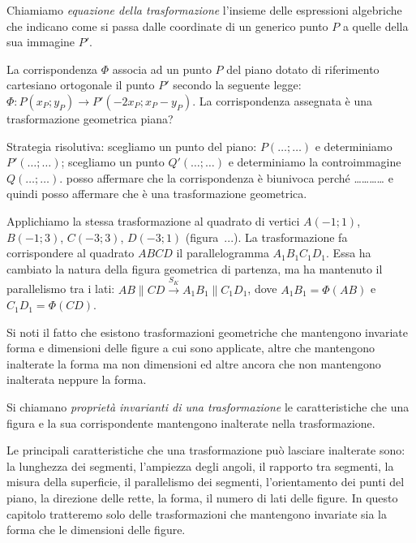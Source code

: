 \begin{definizione}
Chiamiamo \emph{equazione della trasformazione} l'insieme delle espressioni algebriche che indicano come si passa dalle coordinate di un generico punto $P$ a quelle della sua immagine $P'$.
\end{definizione}

\begin{exrig}
\begin{esempio}
La corrispondenza $\Phi$ associa ad un punto $P$ del piano dotato di riferimento cartesiano ortogonale il punto $P'$ secondo la seguente legge:
$\Phi : P(x_P;y_P) \rightarrow P'(-2x_P;x_P-y_P)$. La corrispondenza assegnata è una trasformazione geometrica piana?\vspace{7pt}

Strategia risolutiva: 
scegliamo un punto del piano: $P(\ldots{};\ldots{})$ e determiniamo $P'(\ldots{};\ldots{})$;
scegliamo un punto $Q'(\ldots{};\ldots{})$ e determiniamo la controimmagine $Q(\ldots{};\ldots{})$.
posso affermare che la corrispondenza è biunivoca perché \ldots\ldots\ldots\ldots{} e quindi posso affermare che è una trasformazione geometrica.

Applichiamo la stessa trasformazione al quadrato di vertici $A(-1;1)$, $B(-1;3)$, $C(-3;3)$, $D(-3;1)$ (figura~...).
La trasformazione fa corrispondere al quadrato $ABCD$ il parallelogramma $A_1B_1C_1D_1$. Essa ha cambiato la natura della figura geometrica di partenza, ma ha mantenuto il parallelismo tra i lati: $AB\parallel CD \overset{S_K}{\rightarrow} A_1B_1\parallel C_1D_1$, dove $A_1B_1=\Phi(AB)$ e $C_1D_1=\Phi(CD)$.
\end{esempio}
\end{exrig}

Si noti il fatto che esistono trasformazioni geometriche che mantengono invariate forma e dimensioni delle figure a cui sono applicate, altre che mantengono inalterate la forma ma non dimensioni ed altre ancora che non mantengono inalterata neppure la forma.

\begin{definizione}
Si chiamano \emph{proprietà invarianti di una trasformazione} le caratteristiche che una figura e la sua corrispondente mantengono inalterate nella trasformazione.
\end{definizione}

Le principali caratteristiche che una trasformazione può lasciare inalterate sono: la lunghezza dei segmenti, l'ampiezza degli angoli, il rapporto tra segmenti, la misura della superficie, il parallelismo dei segmenti, l'orientamento dei punti del piano, la direzione delle rette, la forma, il numero di lati delle figure.
In questo capitolo tratteremo solo delle trasformazioni che mantengono invariate sia la forma che le dimensioni delle figure.

